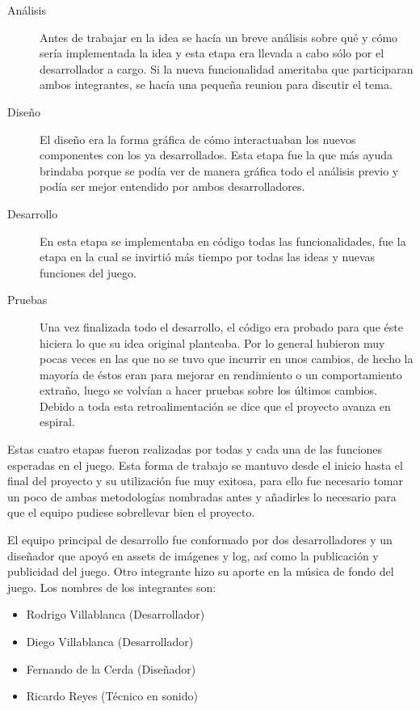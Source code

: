 \documentclass[a4paper,12pt,openany,oneside]{book}
\begin{document}
\begin{description}
\item[Análisis] Antes de trabajar en la idea se hacía un breve análisis sobre qué y cómo sería implementada la idea y esta etapa era llevada a cabo sólo por el desarrollador a cargo. Si la nueva funcionalidad ameritaba que participaran ambos integrantes, se hacía una pequeña reunion para discutir el tema.
\item[Diseño] El diseño era la forma gráfica de cómo interactuaban los nuevos componentes con los ya desarrollados. Esta etapa fue la que más ayuda brindaba porque se podía ver de manera gráfica todo el análisis previo y podía ser mejor entendido por ambos desarrolladores.
\item[Desarrollo] En esta etapa se implementaba en código todas las funcionalidades, fue la etapa en la cual se invirtió más tiempo por todas las ideas y nuevas funciones del juego.
\item[Pruebas] Una vez finalizada todo el desarrollo, el código era probado para que éste hiciera lo que su idea original planteaba. Por lo general hubieron muy pocas veces en las que no se tuvo que incurrir en unos cambios, de hecho la mayoría de éstos eran para mejorar en rendimiento o un comportamiento extraño, luego se volvían a hacer pruebas sobre los últimos cambios. Debido a toda esta retroalimentación se dice que el proyecto avanza en espiral.
\end{description}
Estas cuatro etapas fueron realizadas por todas y cada una de las funciones esperadas en el juego. Esta forma de trabajo se mantuvo desde el inicio hasta el final del proyecto y su utilización fue muy exitosa, para ello fue necesario tomar un poco de ambas metodologías nombradas antes y añadirles lo necesario para que el equipo pudiese sobrellevar bien el proyecto.

El equipo principal de desarrollo fue conformado por dos desarrolladores y un diseñador que apoyó en assets de imágenes y log, así como la publicación y publicidad del juego. Otro integrante hizo su aporte en la música de fondo del juego.
Los nombres de los integrantes son:
\begin{itemize}
\item Rodrigo Villablanca (Desarrollador)
\item Diego Villablanca (Desarrollador)
\item Fernando de la Cerda (Diseñador)
\item Ricardo Reyes (Técnico en sonido)
\end{itemize}
\end{document}
